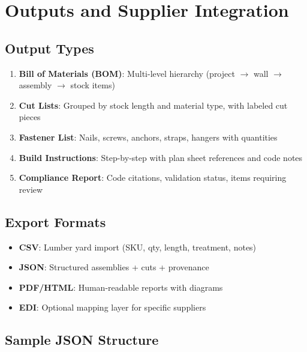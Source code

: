 
\section{Outputs and Supplier Integration}

\subsection{Output Types}

\begin{enumerate}
  \item \textbf{Bill of Materials (BOM)}: Multi-level hierarchy (project $\rightarrow$ wall $\rightarrow$ assembly $\rightarrow$ stock items)
  \item \textbf{Cut Lists}: Grouped by stock length and material type, with labeled cut pieces
  \item \textbf{Fastener List}: Nails, screws, anchors, straps, hangers with quantities
  \item \textbf{Build Instructions}: Step-by-step with plan sheet references and code notes
  \item \textbf{Compliance Report}: Code citations, validation status, items requiring review
\end{enumerate}

\subsection{Export Formats}

\begin{itemize}
  \item \textbf{CSV}: Lumber yard import (SKU, qty, length, treatment, notes)
  \item \textbf{JSON}: Structured assemblies + cuts + provenance
  \item \textbf{PDF/HTML}: Human-readable reports with diagrams
  \item \textbf{EDI}: Optional mapping layer for specific suppliers
\end{itemize}

\subsection{Sample JSON Structure}

